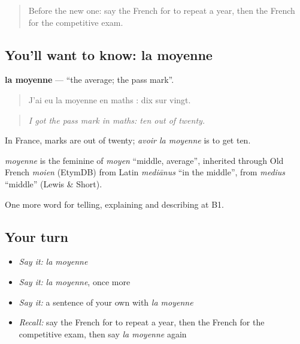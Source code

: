 \begin{quote}
Before the new one: say the French for to repeat a year, then the French for the competitive exam.
\end{quote}

\subsection*{You'll want to know: la moyenne}
\textbf{la moyenne} — \textquotedblleft{}the average; the pass mark\textquotedblright{}.

\begin{quote}
J'ai eu la moyenne en maths : dix sur vingt.
\end{quote}

\begin{quote}
\emph{I got the pass mark in maths: ten out of twenty.}
\end{quote}

In France, marks are out of twenty; \emph{avoir la moyenne} is to get ten.

\begin{cousinweb}
\emph{moyenne} is the feminine of \emph{moyen} \textquotedblleft{}middle, average\textquotedblright{}, inherited through Old French \emph{moien} (EtymDB) from Latin \emph{mediānus} \textquotedblleft{}in the middle\textquotedblright{}, from \emph{medius} \textquotedblleft{}middle\textquotedblright{} (Lewis \& Short).
\end{cousinweb}

\begin{grammarlens}[title={What you've built}]
One more word for telling, explaining and describing at B1.
\end{grammarlens}

\subsection*{Your turn}
\begin{itemize}
\raggedright
  \item \emph{Say it:} \emph{la moyenne}
  \item \emph{Say it:} \emph{la moyenne}, once more
  \item \emph{Say it:} a sentence of your own with \emph{la moyenne}
  \item \emph{Recall:} say the French for to repeat a year, then the French for the competitive exam, then say \emph{la moyenne} again
\end{itemize}

